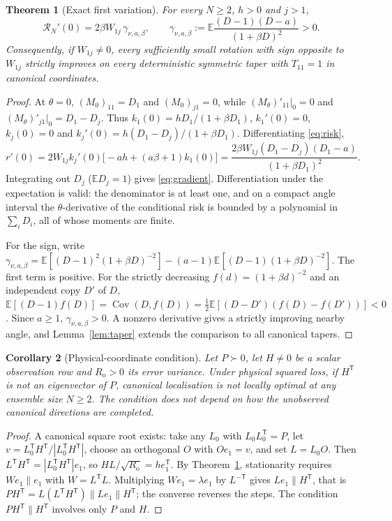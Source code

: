 \documentclass[11pt,a4paper]{article}
\numberwithin{equation}{section}
\newtheorem{theorem}{Theorem}[section]
\newtheorem{corollary}[theorem]{Corollary}
\theoremstyle{remark}\newtheorem{remark}[theorem]{Remark}
\newcommand{\E}{\mathbb E}
\newcommand{\Cov}{\operatorname{Cov}}
\newcommand{\risk}{\mathcal R}
\newcommand{\T}{^{\mathsf T}}
\newcommand{\Rn}{R_{\mathrm o}}
\begin{document}
\begin{theorem}[Exact first variation]\label{thm:gradient}
For every \(N\ge2\), \(h>0\) and \(j>1\),
\begin{equation}\label{eq:gradient}
 \risk_N'(0)=2\beta W_{1j}\,\gamma_{\nu,a,\beta},
 \qquad
 \gamma_{\nu,a,\beta}:=\E\frac{(D-1)(D-a)}{(1+\beta D)^2}>0 .
\end{equation}
Consequently, if \(W_{1j}\ne0\), every sufficiently small rotation with sign opposite to
\(W_{1j}\) strictly improves on every deterministic symmetric taper with \(T_{11}=1\) in canonical
coordinates.
\end{theorem}
\begin{proof}
At \(\theta=0\), \((M_0)_{11}=D_1\) and \((M_0)_{j1}=0\), while
\((M_\theta)'_{11}|_0=0\) and \((M_\theta)'_{j1}|_0=D_1-D_j\). Thus
\(k_1(0)=hD_1/(1+\beta D_1)\), \(k_1'(0)=0\), \(k_j(0)=0\) and
\(k_j'(0)=h(D_1-D_j)/(1+\beta D_1)\). Differentiating \eqref{eq:risk},
\[
 r'(0)=2W_{1j}k_j'(0)\bigl[-ah+(a\beta+1)k_1(0)\bigr]
 =\frac{2\beta W_{1j}(D_1-D_j)(D_1-a)}{(1+\beta D_1)^2}.
\]
Integrating out \(D_j\) (\(\E D_j=1\)) gives \eqref{eq:gradient}. Differentiation under the
expectation is valid: the denominator is at least one, and on a compact angle interval the
\(\theta\)-derivative of the conditional risk is bounded by a polynomial in \(\sum_iD_i\), all of
whose moments are finite.

For the sign, write
\(\gamma_{\nu,a,\beta}=\E[(D-1)^2(1+\beta D)^{-2}]-(a-1)\E[(D-1)(1+\beta D)^{-2}]\).
The first term is positive. For the strictly decreasing \(f(d)=(1+\beta d)^{-2}\) and an
independent copy \(D'\) of \(D\),
\(\E[(D-1)f(D)]=\Cov(D,f(D))=\tfrac12\E[(D-D')(f(D)-f(D'))]<0\). Since \(a\ge1\),
\(\gamma_{\nu,a,\beta}>0\). A nonzero derivative gives a strictly improving nearby angle, and
Lemma~\ref{lem:taper} extends the comparison to all canonical tapers.
\end{proof}

\begin{corollary}[Physical-coordinate condition]\label{cor:physical}
Let \(P\succ0\), let \(H\ne0\) be a scalar observation row and \(\Rn>0\) its error variance.
Under physical squared loss, if \(H\T\) is not an eigenvector of \(P\), canonical localisation is
not locally optimal at any ensemble size \(N\ge2\). The condition does not depend on how the
unobserved canonical directions are completed.
\end{corollary}
\begin{proof}
A canonical square root exists: take any \(L_0\) with \(L_0L_0\T=P\), let \(v=L_0\T H\T/|L_0\T H\T|\),
choose an orthogonal \(O\) with \(Oe_1=v\), and set \(L=L_0O\). Then \(L\T H\T=|L_0\T H\T|e_1\), so
\(HL/\sqrt{\Rn}=he_1\T\). By Theorem~\ref{thm:gradient}, stationarity requires \(We_1\parallel e_1\)
with \(W=L\T L\). Multiplying \(We_1=\lambda e_1\) by \(L^{-\mathsf T}\) gives \(Le_1\parallel H\T\),
that is \(PH\T=L(L\T H\T)\parallel Le_1\parallel H\T\); the converse reverses the steps. The
condition \(PH\T\parallel H\T\) involves only \(P\) and \(H\).
\end{proof}
\end{document}
